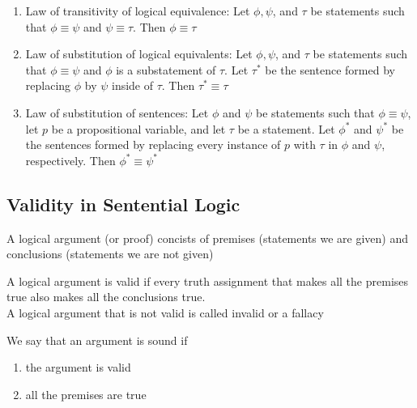 \documentclass{article}
\begin{document}
\begin{proposition}
    \begin{enumerate}
	\item Law of transitivity of logical equivalence: Let $\phi, \psi$,
	    and $\tau$ be statements such that $\phi \equiv \psi$ and
	    $\psi \equiv \tau$. Then $\phi \equiv \tau$
	\item Law of substitution of logical equivalents: Let $\phi, \psi$, and $\tau$ be statements such that $\phi \equiv \psi$ and $\phi$ is a substatement of $\tau$. Let $\tau^{*}$ be the sentence formed by replacing $\phi$ by $\psi$ inside of $\tau$. Then $\tau^{*} \equiv \tau$
	\item Law of substitution of sentences: Let $\phi$ and $\psi$ be statements such that $\phi \equiv \psi$, let $p$ be a propositional variable, and let $\tau$ be a statement. Let $\phi^{*}$ and $\psi^{*}$ be the sentences formed by replacing every instance of $p$ with $\tau$ in $\phi$ and $\psi$, respectively. Then $\phi^{*} \equiv \psi^{*}$
    \end{enumerate}
\end{proposition}

\subsection{Validity in Sentential Logic}

\begin{definition}
    A logical argument (or proof) concists of premises (statements
    we are given) and conclusions (statements we are not given)
\end{definition}

\begin{definition}
    A logical argument is valid if every truth assignment that makes
    all the premises true also makes all the conclusions true.\\
    A logical argument that is not valid is called invalid or a fallacy
\end{definition}

\begin{definition}
    We say that an argument is sound if
    \begin{enumerate}
	\item the argument is valid
	\item all the premises are true
    \end{enumerate}
\end{definition}
\end{document}
